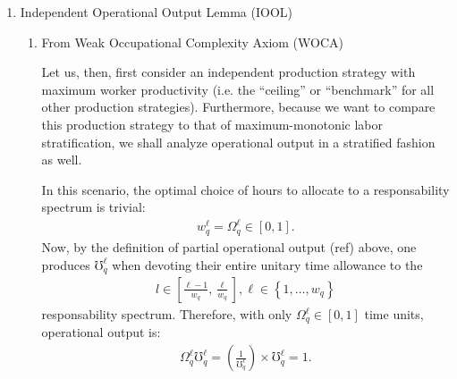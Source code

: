 \documentclass[hidelinks, nonatbib]{elsarticle}
\begin{document}
\begin{enumerate}


\item Independent Operational Output Lemma (IOOL)
\begin{enumerate}
    \item From Weak Occupational Complexity Axiom (WOCA)
    
    Let us, then, first consider an independent production strategy with maximum worker productivity (i.e. the ``ceiling'' or ``benchmark'' for all other production strategies). Furthermore, because we want to compare this production strategy to that of maximum-monotonic labor stratification, we shall analyze operational output in a stratified fashion as well.

    In this scenario, the optimal choice of hours to allocate to a responsability spectrum is trivial:
    \begin{gather}
        w_{q}^{\ell}
        =
        \Omega_{q}^{\ell}
        \in [0,1]
        .
    \end{gather}
    Now, by the definition of partial operational output (ref) above, one produces $\mho_{q}^{\ell}$ when devoting their entire unitary time allowance to the
    \begin{gather}
        l \in \left[
        \frac{\ell - 1}{w_q}
        ,
        \frac{\ell}{w_q}
        \right]
        ,
        \ell \in 
        \left\{
            1, \dots, w_q
        \right\}
    \end{gather}
    responsability spectrum. Therefore, with only $\Omega_{q}^{\ell} \in [0,1]$ time units, operational output is:
    \begin{gather}
        \Omega_{q}^{\ell}
        \mho_{q}^{\ell}
        =
        \left(
            \frac{1}{\mho_{q}^{\ell}}
        \right)
        \times
        \mho_{q}^{\ell}
        =
        1
        .
    \end{gather}


\end{enumerate}
\end{enumerate}
\end{document}
